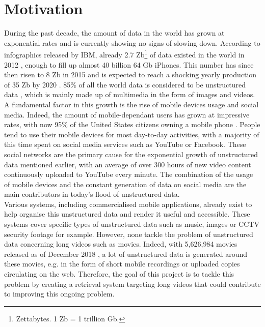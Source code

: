 \section{Motivation}

During the past decade, the amount of data in the world has grown at exponential rates and is currently showing no signs of slowing down. According to infographics released by IBM, already 2.7 Zb\footnote{Zettabytes. 1 Zb = 1 trillion Gb.} of data existed in the world in 2012 \cite{karr_2012}, enough to fill up almost 40 billion 64 Gb iPhones. This number has since then risen to 8 Zb in 2015 and is expected to reach a shocking yearly production of 35 Zb by 2020 \cite{deutscher_2012} \cite{karr_2012}. 85\% of all the world data is considered to be unstructured data \cite{blumberg2003problem}, which is mainly made up of multimedia in the form of images and videos.\\

A fundamental factor in this growth is the rise of mobile devices usage and social media. Indeed, the amount of mobile-dependant users has grown at impressive rates, with now 95\% of the United States citizens owning a mobile phone \cite{fanning2012increasing}. People tend to use their mobile devices for most day-to-day activities, with a majority of this time spent on social media services such as YouTube or Facebook. These social networks are the primary cause for the exponential growth of unstructured data mentioned earlier, with an average of over 300 hours of new video content continuously uploaded to YouTube every minute. The combination of the usage of mobile devices and the constant generation of data on social media are the main contributors in today's flood of unstructured data.\\

Various systems, including commercialised mobile applications, already exist to help organise this unstructured data and render it useful and accessible. These systems cover specific types of unstructured data such as music, images or CCTV security footage for example. However, none tackle the problem of unstructured data concerning long videos such as movies. Indeed, with 5,626,984 movies released as of December 2018 \cite{imdb2018stats}, a lot of unstructured data is generated around these movies, e.g. in the form of short mobile recordings or uploaded copies circulating on the web. Therefore, the goal of this project is to tackle this problem by creating a retrieval system targeting long videos that could contribute to improving this ongoing problem.

